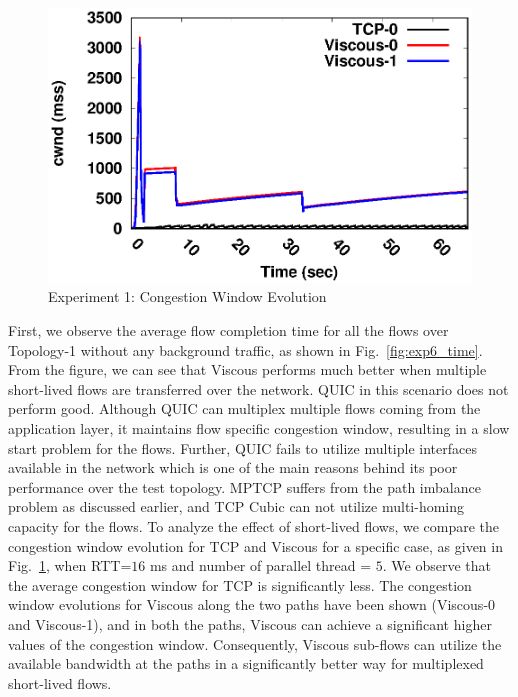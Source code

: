 \begin{figure}[!t]
	\centering
	\includegraphics[width=0.5\linewidth]{img/exp6/cwnd_sample1_5_20}
	\caption{Experiment 1: Congestion Window Evolution}
	\label{fig:exp6_cwnd}
\end{figure}

First, we observe the average flow completion time for all the flows over Topology-1 without any background traffic, as shown in Fig.~\ref{fig:exp6_time}. From the figure, we can see that Viscous performs much better when multiple short-lived flows are transferred over the network. QUIC in this scenario does not perform good. Although QUIC can multiplex multiple flows coming from the application layer, it maintains flow specific congestion window, resulting in a slow start problem for the flows. Further, QUIC fails to utilize multiple interfaces available in the network which is one of the main reasons behind its poor performance over the test topology. MPTCP suffers from the path imbalance problem as discussed earlier, and TCP Cubic can not utilize multi-homing capacity for the flows. To analyze the effect of short-lived flows, we compare the congestion window evolution for TCP and Viscous for a specific case, as given in Fig.~\ref{fig:exp6_cwnd}, when RTT=$16$ ms and number of parallel thread = $5$. We observe that the average congestion window for TCP is significantly less. The congestion window evolutions for Viscous along the two paths have been shown (Viscous-0 and Viscous-1), and in both the paths, Viscous can achieve a significant higher values of the congestion window. Consequently, Viscous sub-flows can utilize the available bandwidth at the paths in a significantly better way for multiplexed short-lived flows. 

%
%

